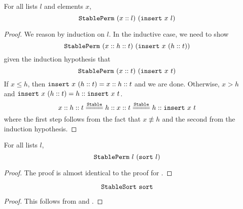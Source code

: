 \documentclass[sigplan,10pt,anonymous,review]{thesis}
\begin{document}
\begin{lemma}
  For all lists $l$ and elements $x$,
  \begin{equation*}
    \texttt{\textup{StablePerm}}~(x::l)~(\texttt{\textup{insert}}~x~l)
  \end{equation*}
\end{lemma}
\begin{proof}
  We reason by induction on $l$. In the inductive case, we need to show
  \begin{equation*}
    \texttt{\textup{StablePerm}}~(x::h::t)~(\texttt{\textup{insert}}~x~(h::t))
  \end{equation*}
  given the induction hypothesis that
  \begin{equation*}
    \texttt{\textup{StablePerm}}~(x::t)~(\texttt{\textup{insert}}~x~t)
  \end{equation*}
  If $x \le h$, then $\texttt{\textup{insert}}~x~(h::t) = x :: h :: t$ and we are
  done. Otherwise, $x > h$ and $\texttt{\textup{insert}}~x~(h::t) = h ::
  \texttt{\textup{insert}}~x~t$.
  \begin{equation*}
    x :: h :: t \eqstable h :: x :: t \eqstable h :: \var{insert}~x~t
  \end{equation*}
  where the first step follows from the fact that $x \not\equiv h$ and the
  second from the induction hypothesis.
\end{proof}

\begin{theorem}
  For all lists $l$,
  \begin{equation*}
    \texttt{\textup{StablePerm}}~l~(\texttt{\textup{sort}}~l)
  \end{equation*}
\end{theorem}
\begin{proof}
  The proof is almost identical to the proof for .
\end{proof}

\begin{theorem}
  \begin{equation*}
    \texttt{\textup{StableSort}}~\texttt{\textup{sort}}
  \end{equation*}
\end{theorem}
\begin{proof}
  This follows from  and .
\end{proof}

\section{}
\label{appendix:hdsort_sorted_S}
\end{document}
